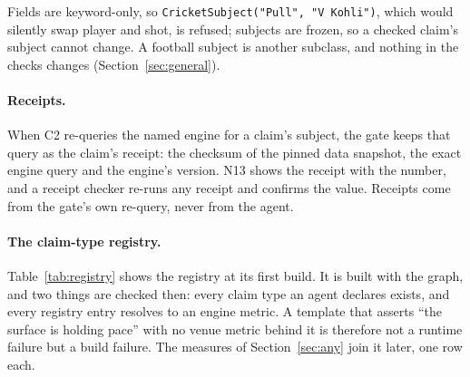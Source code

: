 \documentclass[11pt,a4paper]{article}
\begin{document}
\noindent Fields are keyword-only, so \texttt{CricketSubject("Pull", "V Kohli")},
which would silently swap player and shot, is refused; subjects are frozen, so a
checked claim's subject cannot change. A football subject is another subclass,
and nothing in the checks changes (Section~\ref{sec:general}).

\paragraph{Receipts.} When C2 re-queries the named engine for a claim's subject,
the gate keeps that query as the claim's receipt: the checksum of the pinned data
snapshot, the exact engine query and the engine's version. N13 shows the receipt
with the number, and a receipt checker re-runs any receipt and confirms the
value. Receipts come from the gate's own re-query, never from the agent.

\paragraph{The claim-type registry.} Table~\ref{tab:registry} shows the registry
at its first build. It is built with the graph, and two things are checked then:
every claim type an agent declares exists, and every registry entry resolves to
an engine metric. A template that asserts ``the surface is holding pace'' with no
venue metric behind it is therefore not a runtime failure but a build failure.
The measures of Section~\ref{sec:any} join it later, one row each.
\end{document}
